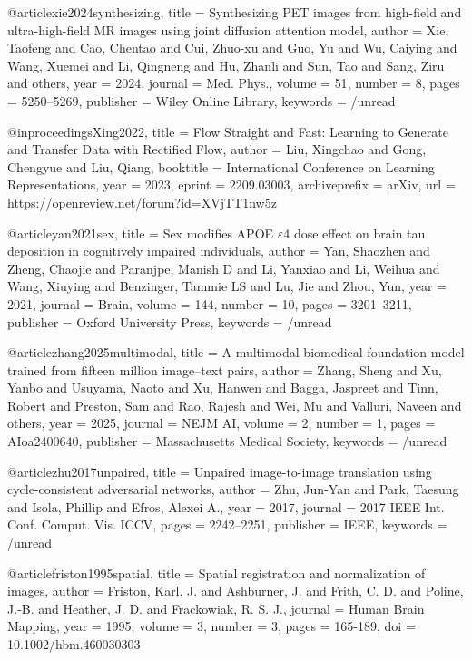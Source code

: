 @article{xie2024synthesizing,
  title = {Synthesizing {{PET}} images from high-field and ultra-high-field {{MR}} images using joint diffusion attention model},
  author = {Xie, Taofeng and Cao, Chentao and Cui, Zhuo-xu and Guo, Yu and Wu, Caiying and Wang, Xuemei and Li, Qingneng and Hu, Zhanli and Sun, Tao and Sang, Ziru and others},
  year = 2024,
  journal = {Med. Phys.},
  volume = {51},
  number = {8},
  pages = {5250--5269},
  publisher = {Wiley Online Library},
  keywords = {/unread}
}

@inproceedings{Xing2022,
 title = {Flow Straight and Fast: Learning to Generate and Transfer Data with Rectified Flow},
 author = {Liu, Xingchao and Gong, Chengyue and Liu, Qiang},
 booktitle = {International Conference on Learning Representations},
 year = {2023},
 eprint = {2209.03003},
 archiveprefix = {arXiv},
 url = {https://openreview.net/forum?id=XVjTT1nw5z}
}

@article{yan2021sex,
  title = {Sex modifies {{APOE}} {{$\varepsilon$}}4 dose effect on brain tau deposition in cognitively impaired individuals},
  author = {Yan, Shaozhen and Zheng, Chaojie and Paranjpe, Manish D and Li, Yanxiao and Li, Weihua and Wang, Xiuying and Benzinger, Tammie LS and Lu, Jie and Zhou, Yun},
  year = 2021,
  journal = {Brain},
  volume = {144},
  number = {10},
  pages = {3201--3211},
  publisher = {Oxford University Press},
  keywords = {/unread}
}

@article{zhang2025multimodal,
  title = {A multimodal biomedical foundation model trained from fifteen million image--text pairs},
  author = {Zhang, Sheng and Xu, Yanbo and Usuyama, Naoto and Xu, Hanwen and Bagga, Jaspreet and Tinn, Robert and Preston, Sam and Rao, Rajesh and Wei, Mu and Valluri, Naveen and others},
  year = 2025,
  journal = {NEJM AI},
  volume = {2},
  number = {1},
  pages = {AIoa2400640},
  publisher = {Massachusetts Medical Society},
  keywords = {/unread}
}

@article{zhu2017unpaired,
  title = {Unpaired image-to-image translation using cycle-consistent adversarial networks},
  author = {Zhu, Jun-Yan and Park, Taesung and Isola, Phillip and Efros, Alexei A.},
  year = 2017,
  journal = {2017 IEEE Int. Conf. Comput. Vis. ICCV},
  pages = {2242--2251},
  publisher = {IEEE},
  keywords = {/unread}
}

@article{friston1995spatial,
  title = {Spatial registration and normalization of images},
  author = {Friston, Karl. J. and Ashburner, J. and Frith, C. D. and Poline, J.‐B. and Heather, J. D. and Frackowiak, R. S. J.},
  journal = {Human Brain Mapping},
  year = {1995},
  volume = {3},
  number = {3},
  pages = {165-189},
  doi = {10.1002/hbm.460030303}
}


